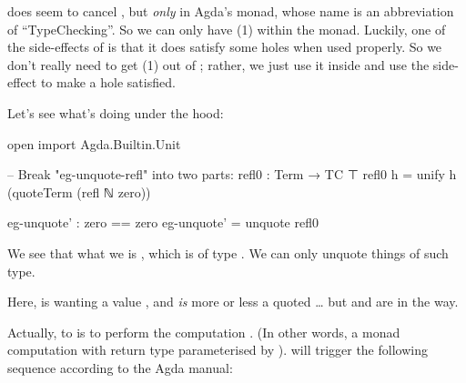 \documentclass{article}
\newcommand{\superEmph}{\emph}
\begin{document}
 does seem to cancel , but \superEmph{only} in Agda's  monad, whose name is an abbreviation of ``TypeChecking''. So we can only have (1) within the  monad. Luckily, one of the side-effects of  is that it does satisfy some holes when used properly. So we don't really need to get (1) out of ; rather, we just use it inside and use the side-effect to make a hole satisfied.

Let's see what's  doing under the hood:

\begin{code}
open import Agda.Builtin.Unit

-- Break "eg-unquote-refl" into two parts:
refl0 : Term → TC ⊤
refl0 h = unify h (quoteTerm (refl {ℕ} {zero}))

eg-unquote' : zero == zero
eg-unquote' = unquote refl0
\end{code}

We see that what we  is , which is of type  \AgdaSymbol{->}  . We can only unquote things of such type.

Here,  is wanting a value , and  \emph{is} more or less a quoted \ldots{} but  and  are in the way.

Actually, to  is to perform the computation  \AgdaSymbol{:}    . (In other words, a  monad computation with return type  parameterised by ).  will trigger the following sequence according to the Agda manual:
\end{document}
